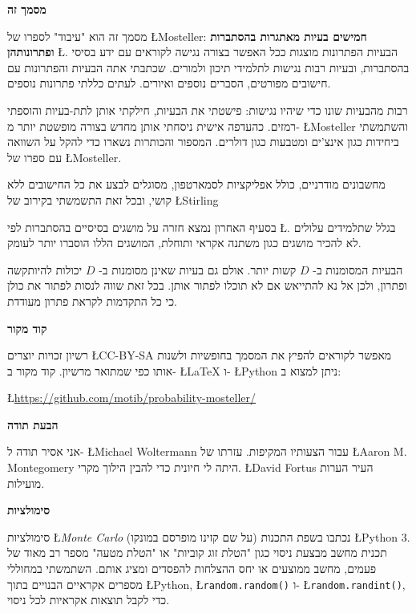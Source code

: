 \medskip

\textbf{מסמך זה}

מסמך זה הוא "עיבוד" לספרו של 
\L{Mosteller}: 
\textbf{חמישים בעיות מאתגרות בהסתברות ופתרונותהן}
\L{\cite{fifty}}.
הבעיות הפתרונות מוצגות ככל האפשר בצורה נגישה לקוראים עם ידע בסיסי בהסתברות, ובעיות רבות נגישות לתלמידי תיכון ולמורים. שכתבתי אתה הבעיות והפתרונות עם חישובים מפורטים, הסברים נוספים ואיורים. לעתים כללתי פתרונות נוספים.

רבות מהבעיות שונו כדי שיהיו נגישות: פישטתי את הבעיות, חילקתי אותן לתת-בעיות והוספתי רמזים. כהעדפה אישית ניסחתי אותן מחדש בצורה מופשטת יותר מ-%
\L{Mosteller}
והשתמשתי ביחידות כגון אינצ'ים ומטבעות כגון דולרים. המספור והכותרות נשארו כדי להקל על השוואה עם ספרו של
\L{Mosteller}.

מחשבונים מודרניים, כולל אפליקציות לסמארטפון, מסוגלים לבצע את כל החישובים ללא קושי, ובכל זאת התשמשתי בקירוב של
\L{Stirling}

בסעיף האחרון נמצא חזרה על מושגים בסיסיים בהסתברות לפי
\L{\cite{ross}}.
בגלל שתלמידים עלולים לא להכיר מושגים כגון משתנה אקראי ותוחלת, המושגים הללו הוסברו יותר לעומק.

הבעיות המסומנות ב-%
$D$
קשות יותר. אולם גם בעיות שאינן מסומנות ב-%
$D$
יכולות להיותקשה ופתרון, ולכן אל נא להתייאש אם לא תוכלו לפתור אותן. בכל זאת שווה לנסות לפתור את כולן כי כל התקדמות לקראת פתרון מעודדת.

\textbf{קוד מקור}

רשיון זכויות יוצרים 
\L{CC-BY-SA}
מאפשר לקוראים להפיץ את המסמך בחופשיות ולשנות אותו כפי שמתואר מרשיון. קוד מקור ב-%
\L{\LaTeX}
ו-%
\L{Python}
ניתן למצוא ב:
\vspace{-2ex}
\begin{center}
\L{\url{https://github.com/motib/probability-mosteller/}}
\end{center}

\textbf{הבעת תודה}

אני אסיר תודה ל-%
\L{Michael Woltermann}
עבור הצעותיו המקיפות. עזרתו של
\L{Aaron M. Montegomery}
היתה לי חיונית כדי להבין הילוך מקרי. 
\L{David Fortus}
העיר הערות מועילות.

\textbf{סימולציות}

סימולציות
\L{\emph{Monte Carlo}}
(על שם קזינו מופרסם במונקו) נכתבו בשפת התכנות
\L{Python 3}.
תכנית מחשב מבצעת ניסוי כגון "הטלת זוג קוביות" או "הטלת מטעה" מספר רב מאוד של פעמים, מחשב ממוצעים או יחס ההצלחות להפסדים ומציג אותם. השתמשתי במחוללי מספרים אקראיים הבנויים בתוך
\L{Python},
\L{\texttt{random.random()}}
ו-%
\L{\texttt{random.randint()}},
כדי לקבל תוצאות אקראיות לכל ניסוי.

